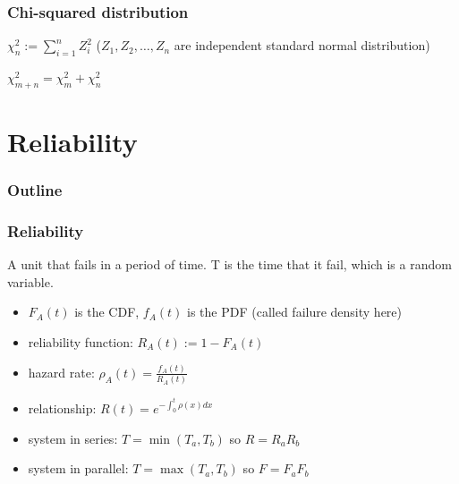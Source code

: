 \documentclass{beamer}
\begin{document}
\begin{frame}
    \frametitle{Chi-squared distribution}

    $\chi_{n}^2:=\sum\limits_{i=1}^{n}Z_i^2$ ($Z_1, Z_2, \dots , Z_n$ are independent standard normal distribution)\par

    $\chi^2_{m+n}=\chi^2_{m}+\chi^2_{n}$

\end{frame}

\section{Reliability}

\begin{frame}
    \frametitle{Outline}
    \tableofcontents[currentsection]
\end{frame}

\begin{frame}
    \frametitle{Reliability}

    A unit that fails in a period of time. T is the time that it fail, which is a random variable.
    \begin{itemize}
        \item $F_A(t)$ is the CDF, $f_A(t)$ is the PDF (called failure density here)
        \item reliability function: $R_A(t):=1-F_A(t)$
        \item hazard rate: $\rho_A(t)=\frac{f_A(t)}{R_A(t)}$
        \item relationship: $R(t)=e^{-\int_{0}^{t}\rho(x)dx}$
        \item system in series: $T=\min(T_a, T_b)$ so $R=R_a R_b$
        \item system in parallel: $T=\max(T_a, T_b)$ so $F=F_a F_b$
    \end{itemize}

\end{frame}
\end{document}
